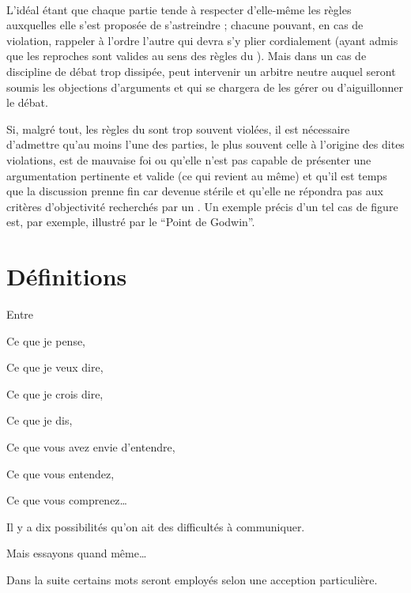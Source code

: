 \paragraph{}
L’idéal étant que chaque partie tende à respecter d’elle-même les règles auxquelles elle s’est proposée de s’astreindre ; chacune pouvant, en cas de violation, rappeler à l’ordre l’autre qui devra s’y plier cordialement (ayant admis que les reproches sont valides au sens des règles du \mainabbr{}). Mais dans un cas de discipline de débat trop dissipée, peut intervenir un arbitre neutre auquel seront soumis les objections d’arguments et qui se chargera de les gérer ou d’aiguillonner le débat.

Si, malgré tout, les règles du \mainabbr{} sont trop souvent violées, il est nécessaire d’admettre qu’au moins l’une des parties, le plus souvent celle à l’origine des dites violations, est de mauvaise foi ou qu’elle n’est pas capable de présenter une argumentation pertinente et valide (ce qui revient au même) et qu’il est temps que la discussion prenne fin car devenue stérile et qu’elle ne répondra pas aux critères d’objectivité recherchés par un \mainabbr{}. Un exemple précis d’un tel cas de figure est, par exemple, illustré par le \enquote{Point de Godwin}.


\section{Définitions}
\epigraph{Entre

Ce que je pense,

Ce que je veux dire,

Ce que je crois dire,

Ce que je dis,

Ce que vous avez envie d’entendre,

Ce que vous entendez,

Ce que vous comprenez…

Il y a dix possibilités qu’on ait des difficultés à communiquer.

Mais essayons quand même…
}{}
Dans la suite certains mots seront employés selon une acception particulière.

